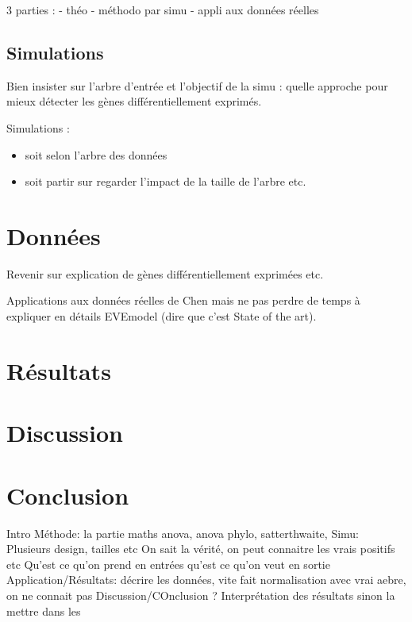 \documentclass[a4paper, 12pt]{article}\usepackage[]{graphicx}\usepackage[]{xcolor}
\begin{document}

3 parties :
- théo
- méthodo par simu
- appli aux données réelles



\subsection{Simulations}


Bien insister sur l'arbre d'entrée et l'objectif de la simu : quelle approche pour mieux détecter les gènes différentiellement exprimés.

Simulations :
\begin{itemize}
    \item soit selon l'arbre des données
    \item soit partir sur regarder l'impact de la taille de l'arbre etc.
\end{itemize}

\section{Données}
\label{chap:data}


Revenir sur explication de gènes différentiellement exprimées etc.

Applications aux données réelles de Chen mais ne pas perdre de temps à expliquer en détails EVEmodel (dire que c'est State of the art).

\section{Résultats}
\label{chap:results}



\section{Discussion}
\label{chap:discuss}

\section{Conclusion}
\label{chap:conclu}
Intro
Méthode: la partie maths anova, anova phylo, satterthwaite, 
Simu: Plusieurs design, tailles etc
On sait la vérité, on peut connaitre les vrais positifs etc 
Qu'est ce qu'on prend en entrées qu'est ce qu'on veut en sortie
Application/Résultats: décrire les données, vite fait normalisation avec vrai aebre, on ne connait pas 
Discussion/COnclusion ? Interprétation des résultats sinon la mettre dans les 

\printbibliography
\nocite{*}

\end{document}
